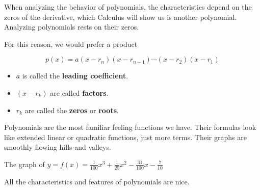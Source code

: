 \documentclass{ximera}
\begin{document}
When analyzing the behavior of polynomials, the characteristics depend on the zeros of the derivative, which Calculus will show us is another polynomial.  Analyzing polynomials rests on their zeros.


For this reason, we would prefer a product

\[   p(x) = a (x-r_n)(x-r_{n-1})  \cdots (x-r_2)(x-r_1)  \]


\begin{itemize}

\item $a$ is called the \textbf{leading coefficient}.
\item $(x-r_k)$ are called \textbf{factors}.
\item $r_k$ are called the \textbf{zeros} or \textbf{roots}.

\end{itemize}






Polynomials are the most familiar feeling functions we have. Their formulas look like extended linear or quadratic functions, just more terms. Their graphs are smoothly flowing hills and valleys.

The graph of $y = f(x) = \frac{1}{100} x^3 + \frac{1}{25} x^2 - \frac{31}{100} x - \frac{7}{10}$

\begin{image}
\end{image}



All the characteristics and features of polynomials are nice.
\end{document}
